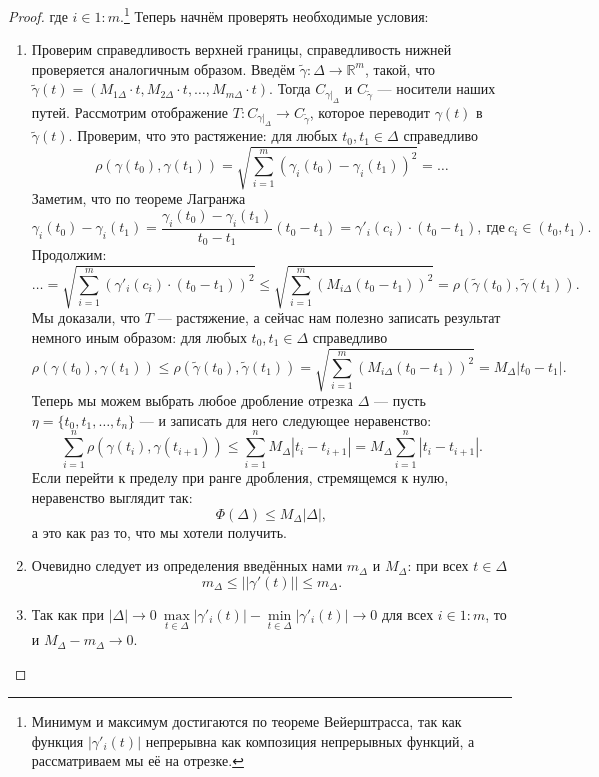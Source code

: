 \begin{proof}
	
	где \(i \in 1 : m\).\footnote{Минимум и максимум достигаются по теореме Вейерштрасса, так как функция \(|\gamma'_i(t)|\) непрерывна как композиция непрерывных функций, а рассматриваем мы её на отрезке.} Теперь начнём проверять необходимые условия:
	\begin{enumerate}
		\item Проверим справедливость верхней границы, справедливость нижней проверяется аналогичным образом. Введём \(\widetilde{\gamma} \colon \Delta \to \mathbb{R}^m\), такой, что \(\widetilde{\gamma}(t) = (M_{1\Delta} \cdot t, M_{2\Delta} \cdot t, \ldots, M_{m\Delta} \cdot t)\). Тогда \(C_{\gamma |_\Delta}\) и \(C_{\widetilde{\gamma}}\) --- носители наших путей. Рассмотрим отображение \(T \colon C_{\gamma |_\Delta} \to C_{\widetilde{\gamma}}\), которое переводит \(\gamma(t)\) в \(\widetilde{\gamma}(t)\). Проверим, что это растяжение: для любых  \(t_0, t_1 \in \Delta\) справедливо \[
			\rho(\gamma(t_0), \gamma(t_1)) =  \sqrt{\sum\limits_{i = 1}^m (\gamma_i (t_0) - \gamma_i (t_1))^2} = \ldots
		\]
		 Заметим, что по теореме Лагранжа \[
			\gamma_i (t_0) - \gamma_i (t_1) = \frac{\gamma_i (t_0) - \gamma_i (t_1)}{t_0 - t_1} (t_0 - t_1) = \gamma'_i(c_i) \cdot (t_0 - t_1), \ \text{где} \ c_i \in (t_0, t_1).
		\]
		Продолжим: \[
			\ldots =  \sqrt{\sum\limits_{i = 1}^m (\gamma'_i(c_i) \cdot (t_0 - t_1))^2} \leqslant \sqrt{\sum\limits_{i = 1}^m (M_{i\Delta} (t_0 - t_1) )^2} = \rho(\widetilde{\gamma}(t_0), \widetilde{\gamma}(t_1)).
		\]
		Мы доказали, что \(T\) --- растяжение, а сейчас нам полезно записать результат немного иным образом: для любых \(t_0, t_1 \in \Delta\) справедливо \[
			\rho(\gamma(t_0), \gamma(t_1)) \leqslant \rho(\widetilde{\gamma}(t_0), \widetilde{\gamma}(t_1)) = \sqrt{\sum\limits_{i = 1}^m (M_{i\Delta} (t_0 - t_1) )^2} = M_\Delta |t_0 - t_1|.
		\]
		Теперь мы можем выбрать любое дробление отрезка \(\Delta\) --- пусть \(\eta = \{t_0, t_1, \ldots, t_n\}\) --- и записать для него следующее неравенство: \[
			\sum_{i = 1}^n \rho(\gamma(t_i), \gamma(t_{i + 1})) \leqslant \sum_{i = 1}^n M_\Delta |t_i - t_{i + 1}| = M_\Delta \sum_{i = 1}^n |t_i - t_{i + 1}|.
		\]
		Если перейти к пределу при ранге дробления, стремящемся к нулю, неравенство выглядит так: \[
			\Phi(\Delta) \leqslant M_\Delta |\Delta|,
		\]
		а это как раз то, что мы хотели получить.
		\item Очевидно следует из определения введённых нами \(m_\Delta\) и \(M_\Delta\): при всех \(t \in \Delta\) \[
			m_\Delta \leqslant ||\gamma'(t)||\leqslant m_\Delta.
		\]
		\item Так как при \(|\Delta| \to 0 \ \max\limits_{t \in \Delta} |\gamma'_i (t)| - \min\limits_{t \in \Delta} |\gamma'_i (t)| \to 0\) для всех \(i \in 1 : m\), то и \(M_\Delta - m_\Delta \to 0\).
	\end{enumerate}
\end{proof}

